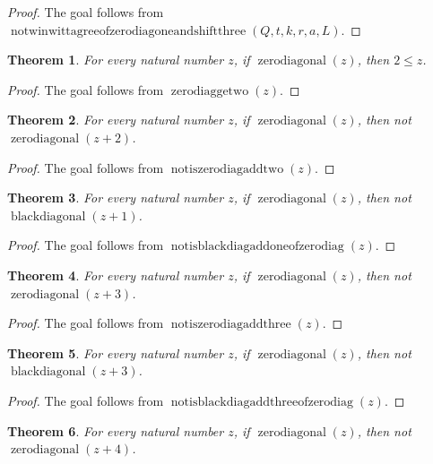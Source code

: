 \documentclass[11pt]{article}
\newtheorem{theorem}{Theorem}[section]
\theoremstyle{definition}
\begin{document}
\begin{proof}
The goal follows from \(\operatorname{notwinwittagreeofzerodiagoneandshiftthree}(Q, t, k, r, a, L)\).
\end{proof}
\begin{theorem}
\label{ll:paper:zero-diag-ge-two}
For every natural number \(z\), if \(\operatorname{zerodiagonal}(z)\), then \(2 \le z\).
\end{theorem}
\begin{proof}
The goal follows from \(\operatorname{zerodiaggetwo}(z)\).
\end{proof}
\begin{theorem}
\label{ll:paper:not-iszerodiag-add-two}
For every natural number \(z\), if \(\operatorname{zerodiagonal}(z)\), then not \(\operatorname{zerodiagonal}(z + 2)\).
\end{theorem}
\begin{proof}
The goal follows from \(\operatorname{notiszerodiagaddtwo}(z)\).
\end{proof}
\begin{theorem}
\label{ll:paper:not-isblackdiag-add-one-of-zero-diag}
For every natural number \(z\), if \(\operatorname{zerodiagonal}(z)\), then not \(\operatorname{blackdiagonal}(z + 1)\).
\end{theorem}
\begin{proof}
The goal follows from \(\operatorname{notisblackdiagaddoneofzerodiag}(z)\).
\end{proof}
\begin{theorem}
\label{ll:paper:not-iszerodiag-add-three}
For every natural number \(z\), if \(\operatorname{zerodiagonal}(z)\), then not \(\operatorname{zerodiagonal}(z + 3)\).
\end{theorem}
\begin{proof}
The goal follows from \(\operatorname{notiszerodiagaddthree}(z)\).
\end{proof}
\begin{theorem}
\label{ll:paper:not-isblackdiag-add-three-of-zero-diag}
For every natural number \(z\), if \(\operatorname{zerodiagonal}(z)\), then not \(\operatorname{blackdiagonal}(z + 3)\).
\end{theorem}
\begin{proof}
The goal follows from \(\operatorname{notisblackdiagaddthreeofzerodiag}(z)\).
\end{proof}
\begin{theorem}
\label{ll:paper:not-iszerodiag-add-four}
For every natural number \(z\), if \(\operatorname{zerodiagonal}(z)\), then not \(\operatorname{zerodiagonal}(z + 4)\).
\end{theorem}
\end{document}
